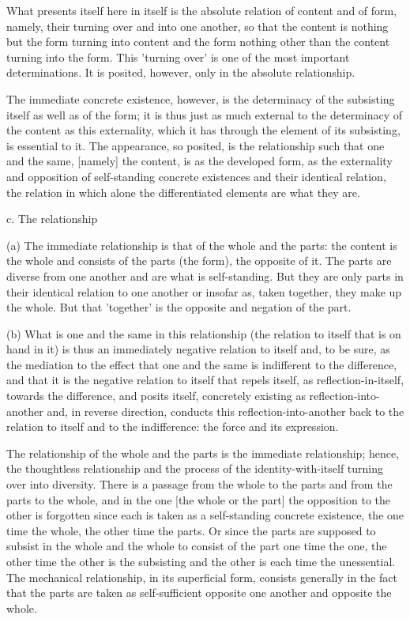What presents itself here in itself is
the absolute relation of content and of form, namely,
their turning over and into one another,
so that the content is nothing but the form turning into content
and the form nothing other than the content turning into the form.
This 'turning over' is one of the most important determinations.
It is posited, however, only in the absolute relationship.

The immediate concrete existence, however, is
the determinacy of the subsisting itself as well as of the form;
it is thus just as much external to the determinacy of the content
as this externality, which it has through the element of its subsisting,
is essential to it.
The appearance, so posited, is the relationship
such that one and the same, [namely] the content, is
as the developed form, as the externality and opposition of
self-standing concrete existences and their identical relation,
the relation in which alone the differentiated elements are what they are.

c. The relationship

(a) The immediate relationship is that of the whole and the parts:
the content is the whole and consists of the parts (the form),
the opposite of it.
The parts are diverse from one another
and are what is self-standing.
But they are only parts in their identical relation to one another
or insofar as, taken together, they make up the whole.
But that 'together' is the opposite and negation of the part.

(b) What is one and the same in this relationship
(the relation to itself that is on hand in it)
is thus an immediately negative relation to itself and,
to be sure, as the mediation to the effect that one and the same
is indifferent to the difference, and that
it is the negative relation to itself that repels itself,
as reflection-in-itself, towards the difference, and posits itself,
concretely existing as reflection-into-another and, in reverse direction,
conducts this reflection-into-another back to
the relation to itself and to the indifference:
the force and its expression.

The relationship of the whole and the parts is
the immediate relationship;
hence, the thoughtless relationship
and the process of the identity-with-itself
turning over into diversity.
There is a passage from the whole to the parts and
from the parts to the whole,
and in the one [the whole or the part]
the opposition to the other is forgotten since
each is taken as a self-standing concrete existence,
the one time the whole, the other time the parts.
Or since the parts are supposed to subsist in the whole
and the whole to consist of the part one time the one,
the other time the other is the subsisting and
the other is each time the unessential.
The mechanical relationship,
in its superficial form,
consists generally in the fact
that the parts are taken as self-sufficient
opposite one another and opposite the whole.


